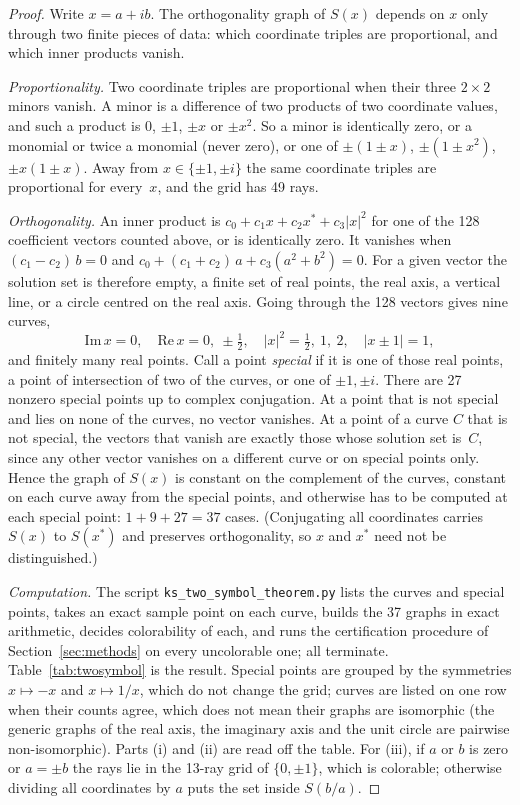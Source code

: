 \begin{proof}
Write $x=a+ib$.  The orthogonality graph of $S(x)$ depends on $x$ only through two finite pieces
of data: which coordinate triples are proportional, and which inner products vanish.

\emph{Proportionality.}  Two coordinate triples are proportional when their three $2\times2$ minors vanish.
A minor is a difference of two products of two coordinate values, and such a product is $0$, $\pm1$, $\pm x$ or $\pm x^2$.  So a minor is identically zero, or a
monomial or twice a monomial (never zero), or one of $\pm(1\pm x)$, $\pm(1\pm x^2)$,
$\pm x(1\pm x)$.  Away from $x\in\{\pm1,\pm i\}$
the same coordinate triples are proportional for every~$x$, and the grid has 49 rays.

\emph{Orthogonality.}  An inner product is $c_0+c_1x+c_2x^{*}+c_3|x|^2$ for one of the 128
coefficient vectors counted above, or is identically zero.  It vanishes when
$(c_1-c_2)\,b=0$ and $c_0+(c_1+c_2)\,a+c_3(a^2+b^2)=0$.  For a given vector the solution set is
therefore empty, a finite set of real points, the real axis, a vertical line, or a circle
centred on the real axis.  Going through the 128 vectors gives nine curves,
\[
\mathrm{Im}\,x=0,\quad \mathrm{Re}\,x=0,\ \pm\tfrac12,\quad |x|^2=\tfrac12,\ 1,\ 2,\quad
|x\pm1|=1,
\]
and finitely many real points.  Call a point \emph{special} if it is one of those real points, a
point of intersection of two of the curves, or one of $\pm1,\pm i$.  There are 27 nonzero special points
up to complex conjugation.  At a point that is not special and lies on none of the curves, no
vector vanishes.  At a point of a curve $C$ that is not special, the vectors that vanish are
exactly those whose solution set is~$C$, since any other vector vanishes on a different curve or
on special points only.  Hence the graph of $S(x)$ is constant on the complement of the curves,
constant on each curve away from the special points, and otherwise has to be computed at each
special point: $1+9+27=37$ cases.  (Conjugating all coordinates carries $S(x)$ to $S(x^{*})$ and
preserves orthogonality, so $x$ and $x^{*}$ need not be distinguished.)

\emph{Computation.}  The script \texttt{ks\_two\_symbol\_theorem.py} lists the curves and special
points, takes an exact sample point on each curve, builds the 37 graphs in exact arithmetic, decides colorability of each, and runs the certification procedure of
Section~\ref{sec:methods} on every uncolorable one; all terminate.
Table~\ref{tab:twosymbol} is the result.  Special points are grouped by the symmetries $x\mapsto-x$
and $x\mapsto1/x$, which do not change the grid; curves are listed on one row when their counts
agree, which does not mean their graphs are isomorphic (the generic graphs of the real axis, the
imaginary axis and the unit circle are pairwise non-isomorphic).  Parts (i) and (ii) are read off the table.  For
(iii), if $a$ or $b$ is zero or $a=\pm b$ the rays lie in the 13-ray grid of $\{0,\pm1\}$, which
is colorable; otherwise dividing all coordinates by $a$ puts the set inside $S(b/a)$.
\end{proof}

